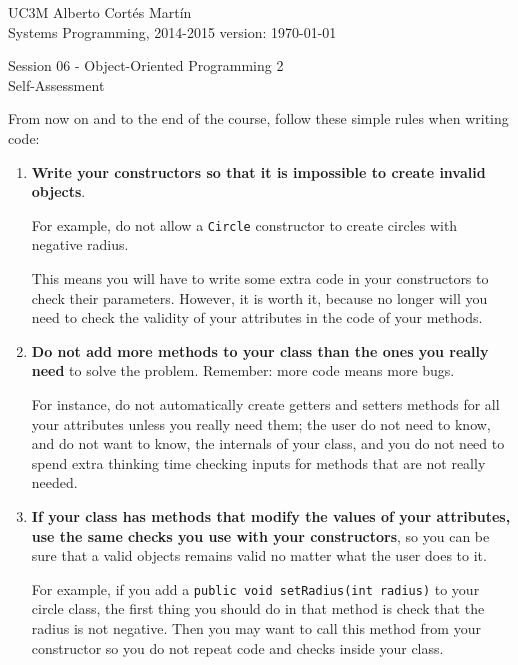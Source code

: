 \documentclass[a4paper, 11pt]{article}
\newcommand{\realtitle}{Session 06 - Object-Oriented Programming 2}
\begin{document}
\makebox[\linewidth]{\rule{\textwidth}{0.4pt}}
UC3M \hfill Alberto Cortés Martín\\
Systems Programming, 2014-2015 \hfill version: \today\\
\makebox[\linewidth]{\rule{\textwidth}{0.4pt}}
\begin{center}
  \Large{\realtitle}\\Self-Assessment
\end{center}
\makebox[\linewidth]{\rule{\textwidth}{0.4pt}}
\vspace{1cm}

From now on and to the end of the course, follow these simple rules when
writing code:

\begin{enumerate}

  \item \textbf{Write your constructors so that it is impossible to create
    invalid objects}.

    For example, do not allow a \verb+Circle+ constructor to
    create circles with negative radius.

    This means you will have to write some extra code in your constructors to
    check their parameters. However, it is worth it, because no longer will you
    need to check the validity of your attributes in the code of your methods.

  \item \textbf{Do not add more methods to your class than the ones you really
    need} to solve the problem. Remember: more code means more bugs.

    For instance, do not automatically create getters and setters methods for
    all your attributes unless you really need them; the user do not need to
    know, and do not want to know, the internals of your class, and you do not
    need to spend extra thinking time checking inputs for methods that are not
    really needed.

  \item \textbf{If your class has methods that modify the values of your
    attributes, use the same checks you use with your constructors}, so you can
    be sure that a valid objects remains valid no matter what the user does to
    it.

    For example, if you add a \verb+public void setRadius(int radius)+ to your
    circle class, the first thing you should do in that method is check that
    the radius is not negative. Then you may want to call this method from your
    constructor so you do not repeat code and checks inside your class.


\end{enumerate}
\end{document}
